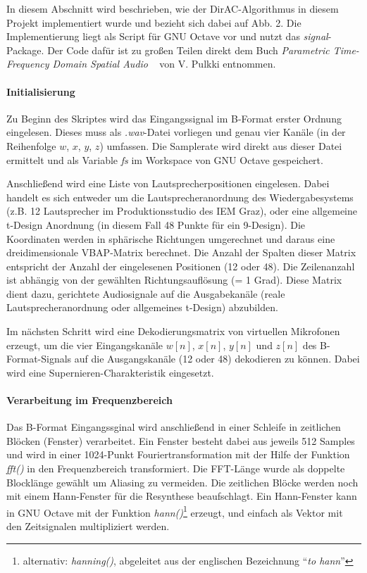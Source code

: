 In diesem Abschnitt wird beschrieben, wie der DirAC-Algorithmus in diesem Projekt implementiert wurde und bezieht sich dabei auf Abb. 2. Die Implementierung liegt als Script für GNU Octave vor und nutzt das \textit{signal}-Package. Der Code dafür ist zu großen Teilen direkt dem Buch \textit{Parametric Time-Frequency Domain Spatial Audio} ~\cite{spatial-book} von V. Pulkki entnommen.

\paragraph{Initialisierung}
Zu Beginn des Skriptes wird das Eingangssignal im B-Format erster Ordnung eingelesen. Dieses muss als \textit{.wav}-Datei vorliegen und genau vier Kanäle (in der Reihenfolge $w$, $x$, $y$, $z$) umfassen. Die Samplerate wird direkt aus dieser Datei ermittelt und als Variable \textit{fs} im Workspace von GNU Octave gespeichert.

Anschließend wird eine Liste von Lautsprecherpositionen eingelesen. Dabei handelt es sich entweder um die Lautsprecheranordnung des Wiedergabesystems (z.B. 12 Lautsprecher im Produktionsstudio des IEM Graz), oder eine allgemeine t-Design Anordnung (in diesem Fall 48 Punkte für ein 9-Design). Die Koordinaten werden in sphärische Richtungen umgerechnet und daraus eine dreidimensionale VBAP-Matrix berechnet. Die Anzahl der Spalten dieser Matrix entspricht der Anzahl der eingelesenen Positionen (12 oder 48). Die Zeilenanzahl ist abhängig von der gewählten Richtungsauflösung (= 1 Grad). Diese Matrix dient dazu, gerichtete Audiosignale auf die Ausgabekanäle (reale Lautsprecheranordnung oder allgemeines t-Design) abzubilden.

Im nächsten Schritt wird eine Dekodierungsmatrix von virtuellen Mikrofonen erzeugt, um die vier Eingangskanäle $w[n]$, $x[n]$, $y[n]$ und $z[n]$ des B-Format-Signals auf die Ausgangskanäle (12 oder 48) dekodieren zu können. Dabei wird eine Supernieren-Charakteristik eingesetzt.

\paragraph{Verarbeitung im Frequenzbereich}
Das B-Format Eingangssginal wird anschließend in einer Schleife in zeitlichen Blöcken (Fenster) verarbeitet. Ein Fenster besteht dabei aus jeweils 512 Samples und wird in einer 1024-Punkt Fouriertransformation mit der Hilfe der Funktion \textit{fft()} in den Frequenzbereich transformiert. Die FFT-Länge wurde als doppelte Blocklänge gewählt um Aliasing zu vermeiden. Die zeitlichen Blöcke werden noch mit einem Hann-Fenster für die Resynthese beaufschlagt. Ein Hann-Fenster kann in GNU Octave mit der Funktion \textit{hann()}\footnote{alternativ: \textit{hanning()}, abgeleitet aus der englischen Bezeichnung ``\textit{to hann}''} erzeugt, und einfach als Vektor mit den Zeitsignalen multipliziert werden.
